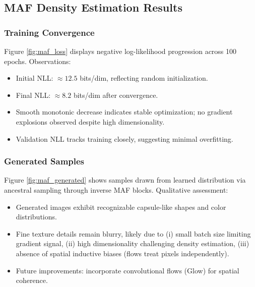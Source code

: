 \documentclass[conference]{IEEEtran}
\begin{document}
\subsection{MAF Density Estimation Results}
\subsubsection{Training Convergence}
Figure \ref{fig:maf_loss} displays negative log-likelihood progression across 100 epochs. Observations:
\begin{itemize}
\item Initial NLL: $\approx 12.5$ bits/dim, reflecting random initialization.
\item Final NLL: $\approx 8.2$ bits/dim after convergence.
\item Smooth monotonic decrease indicates stable optimization; no gradient explosions observed despite high dimensionality.
\item Validation NLL tracks training closely, suggesting minimal overfitting.
\end{itemize}

\subsubsection{Generated Samples}
Figure \ref{fig:maf_generated} shows samples drawn from learned distribution via ancestral sampling through inverse MAF blocks. Qualitative assessment:
\begin{itemize}
\item Generated images exhibit recognizable capsule-like shapes and color distributions.
\item Fine texture details remain blurry, likely due to (i) small batch size limiting gradient signal, (ii) high dimensionality challenging density estimation, (iii) absence of spatial inductive biases (flows treat pixels independently).
\item Future improvements: incorporate convolutional flows (Glow) for spatial coherence.
\end{itemize}
\end{document}
